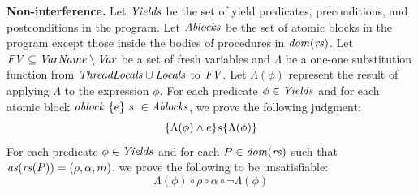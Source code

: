 {\bf Non-interference.}
Let $\mathit{Yields}$ be the set of yield predicates, preconditions, and postconditions in the program.
Let $\mathit{Ablocks}$ be the set of atomic blocks in the program except those inside the bodies of procedures
in $\mathit{dom}(\mathit{rs})$.
Let $\mathit{FV} \subseteq \mathit{VarName} \setminus \mathit{Var}$ be a set of fresh variables and $\Lambda$ be a one-one 
substitution function from $\mathit{ThreadLocals} \cup \mathit{Locals}$ to $\mathit{FV}$.
Let $\Lambda(\phi)$ represent the result of applying $\Lambda$ to the expression $\phi$.
For each predicate $\phi \in \mathit{Yields}$
and for each atomic block $\mathit{ablock}\ {\{e\}}\ {s}\  \in \mathit{Ablocks}$, we prove the following judgment:
\[
\{\Lambda(\phi) \wedge e\} s \{\Lambda(\phi)\}
\]
For each predicate $\phi \in \mathit{Yields}$ and for each $P \in \mathit{dom}(\mathit{rs})$ such that
$\mathit{as}(\mathit{rs}(P)) = (\rho, \alpha, m)$, we prove the following to be unsatisfiable:
\[
\Lambda(\phi) \circ \rho \circ \alpha \circ \neg\Lambda(\phi)
\]

